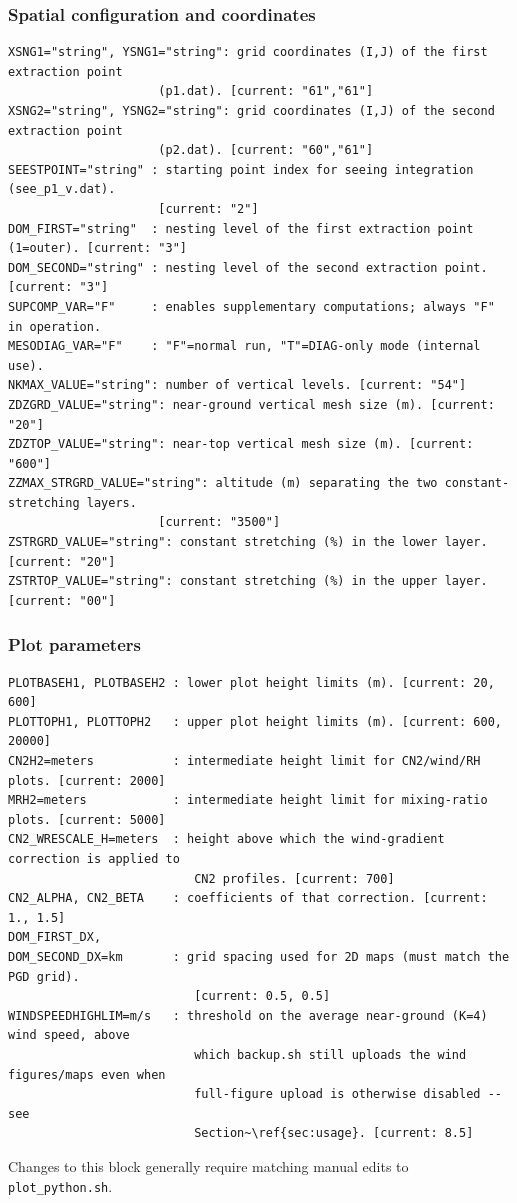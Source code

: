 \subsubsection{Spatial configuration and coordinates}
\begin{lstlisting}
XSNG1="string", YSNG1="string": grid coordinates (I,J) of the first extraction point
                     (p1.dat). [current: "61","61"]
XSNG2="string", YSNG2="string": grid coordinates (I,J) of the second extraction point
                     (p2.dat). [current: "60","61"]
SEESTPOINT="string" : starting point index for seeing integration (see_p1_v.dat).
                     [current: "2"]
DOM_FIRST="string"  : nesting level of the first extraction point (1=outer). [current: "3"]
DOM_SECOND="string" : nesting level of the second extraction point. [current: "3"]
SUPCOMP_VAR="F"     : enables supplementary computations; always "F" in operation.
MESODIAG_VAR="F"    : "F"=normal run, "T"=DIAG-only mode (internal use).
NKMAX_VALUE="string": number of vertical levels. [current: "54"]
ZDZGRD_VALUE="string": near-ground vertical mesh size (m). [current: "20"]
ZDZTOP_VALUE="string": near-top vertical mesh size (m). [current: "600"]
ZZMAX_STRGRD_VALUE="string": altitude (m) separating the two constant-stretching layers.
                     [current: "3500"]
ZSTRGRD_VALUE="string": constant stretching (%) in the lower layer. [current: "20"]
ZSTRTOP_VALUE="string": constant stretching (%) in the upper layer. [current: "00"]
\end{lstlisting}

\subsubsection{Plot parameters}
\begin{lstlisting}
PLOTBASEH1, PLOTBASEH2 : lower plot height limits (m). [current: 20, 600]
PLOTTOPH1, PLOTTOPH2   : upper plot height limits (m). [current: 600, 20000]
CN2H2=meters           : intermediate height limit for CN2/wind/RH plots. [current: 2000]
MRH2=meters            : intermediate height limit for mixing-ratio plots. [current: 5000]
CN2_WRESCALE_H=meters  : height above which the wind-gradient correction is applied to
                          CN2 profiles. [current: 700]
CN2_ALPHA, CN2_BETA    : coefficients of that correction. [current: 1., 1.5]
DOM_FIRST_DX,
DOM_SECOND_DX=km       : grid spacing used for 2D maps (must match the PGD grid).
                          [current: 0.5, 0.5]
WINDSPEEDHIGHLIM=m/s   : threshold on the average near-ground (K=4) wind speed, above
                          which backup.sh still uploads the wind figures/maps even when
                          full-figure upload is otherwise disabled -- see
                          Section~\ref{sec:usage}. [current: 8.5]
\end{lstlisting}
Changes to this block generally require matching manual edits to \texttt{plot\_python.sh}.

